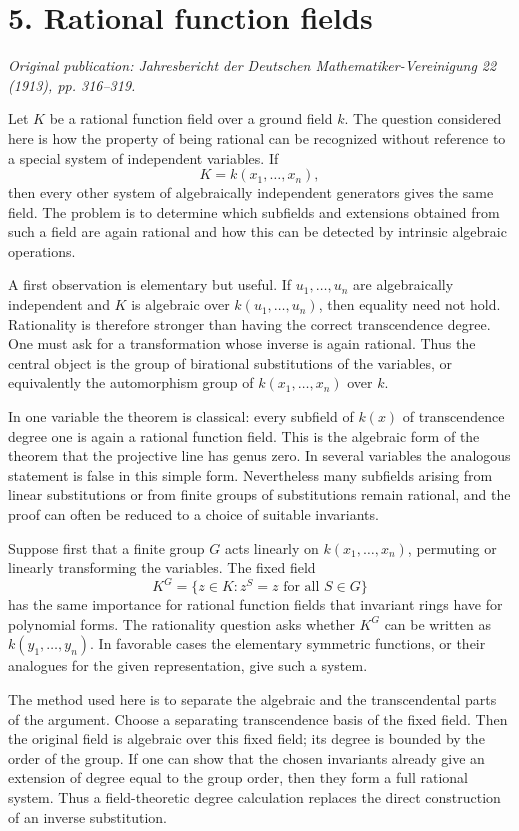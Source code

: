 \documentclass[12pt]{article}
\begin{document}
\section{5. Rational function fields}

\textit{Original publication: Jahresbericht der Deutschen Mathematiker-Vereinigung 22 (1913), pp. 316--319.}

Let \(K\) be a rational function field over a ground field \(k\). The question considered here is
how the property of being rational can be recognized without reference to a special system of
independent variables. If \[   K=k(x_1,\ldots,x_n), \] then every other system of algebraically
independent generators gives the same field. The problem is to determine which subfields and
extensions obtained from such a field are again rational and how this can be detected by intrinsic
algebraic operations.


A first observation is elementary but useful. If \(u_1,\ldots,u_n\) are algebraically independent
and \(K\) is algebraic over \(k(u_1,\ldots,u_n)\), then equality need not hold. Rationality is
therefore stronger than having the correct transcendence degree. One must ask for a transformation
whose inverse is again rational. Thus the central object is the group of birational substitutions of
the variables, or equivalently the automorphism group of \(k(x_1,\ldots,x_n)\) over \(k\).


In one variable the theorem is classical: every subfield of \(k(x)\) of transcendence degree one is
again a rational function field. This is the algebraic form of the theorem that the projective line
has genus zero. In several variables the analogous statement is false in this simple form.
Nevertheless many subfields arising from linear substitutions or from finite groups of substitutions
remain rational, and the proof can often be reduced to a choice of suitable invariants.


Suppose first that a finite group \(G\) acts linearly on \(k(x_1,\ldots,x_n)\), permuting or
linearly transforming the variables. The fixed field \[   K^G=\{z\in K: z^S=z\text{ for all }S\in
G\} \] has the same importance for rational function fields that invariant rings have for polynomial
forms. The rationality question asks whether \(K^G\) can be written as \(k(y_1, \ldots,y_n)\). In
favorable cases the elementary symmetric functions, or their analogues for the given representation,
give such a system.


The method used here is to separate the algebraic and the transcendental parts of the argument.
Choose a separating transcendence basis of the fixed field. Then the original field is algebraic
over this fixed field; its degree is bounded by the order of the group. If one can show that the
chosen invariants already give an extension of degree equal to the group order, then they form a
full rational system. Thus a field-theoretic degree calculation replaces the direct construction of
an inverse substitution.
\end{document}

